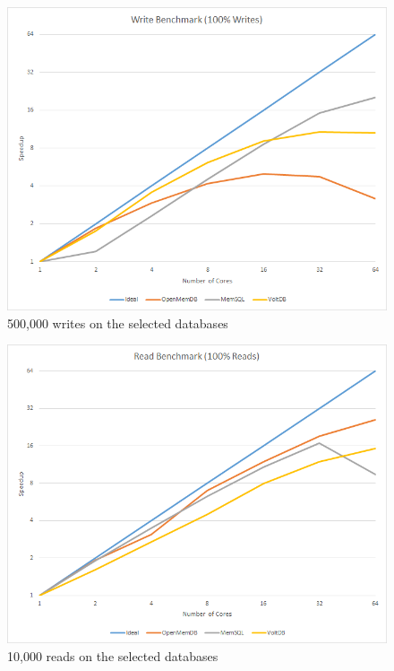 \documentclass[conference, compsoc]{IEEEtran}
\begin{document}
\begin{figure}[H]
 \begin{center}
   \includegraphics[scale=.5]{WriteBenchmark.png}
  \caption{500,000 writes on the selected databases}
  \label{fig:writeBenchmark}
   \end{center}
\end{figure}

\begin{figure}[H]
   \begin{center}
   \includegraphics[scale=.5]{ReadBenchmark.png}
  \caption{10,000 reads on the selected databases}
  \label{fig:readBenchmark}
   \end{center}
\end{figure}
\end{document}
